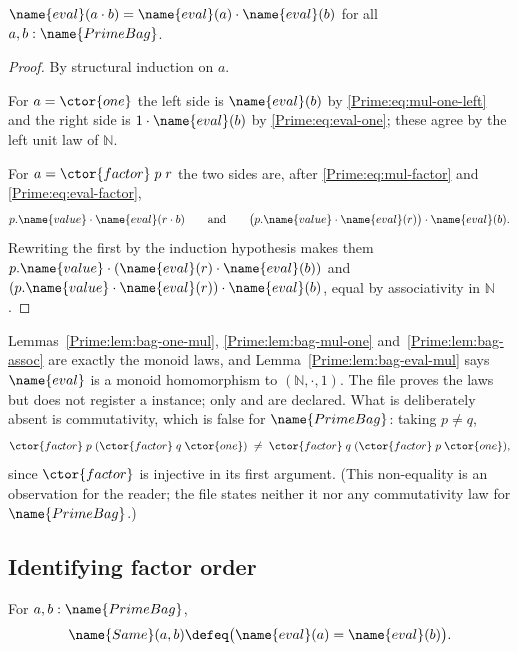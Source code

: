\begin{lemma}\label{Prime:lem:bag-eval-mul}
$\name{eval}(a \cdot b) = \name{eval}(a) \cdot \name{eval}(b)$ for all
$a, b : \name{PrimeBag}$.
\end{lemma}

\begin{proof}
By structural induction on $a$.

For $a = \ctor{one}$ the left side is $\name{eval}(b)$ by
\eqref{Prime:eq:mul-one-left} and the right side is $1 \cdot \name{eval}(b)$ by
\eqref{Prime:eq:eval-one}; these agree by the left unit law of $\mathbb{N}$.

For $a = \ctor{factor}\;p\;r$ the two sides are, after
\eqref{Prime:eq:mul-factor} and \eqref{Prime:eq:eval-factor},
\[
  p.\name{value} \cdot \name{eval}(r \cdot b)
  \qquad\text{and}\qquad
  \bigl(p.\name{value} \cdot \name{eval}(r)\bigr) \cdot \name{eval}(b).
\]
Rewriting the first by the induction hypothesis makes them
$p.\name{value} \cdot (\name{eval}(r) \cdot \name{eval}(b))$ and
$(p.\name{value} \cdot \name{eval}(r)) \cdot \name{eval}(b)$, equal by
associativity in $\mathbb{N}$.
\end{proof}

\begin{remark}\label{Prime:rem:bag-monoid}
Lemmas~\ref{Prime:lem:bag-one-mul}, \ref{Prime:lem:bag-mul-one} and~\ref{Prime:lem:bag-assoc}
are exactly the monoid laws, and Lemma~\ref{Prime:lem:bag-eval-mul} says
$\name{eval}$ is a monoid homomorphism to $(\mathbb{N}, \cdot, 1)$.  The file
proves the laws but does not register a  instance; only
 and  are declared.  What is deliberately absent is
commutativity, which is false for $\name{PrimeBag}$: taking $p \neq q$,
\[
  \ctor{factor}\;p\;(\ctor{factor}\;q\;\ctor{one})
  \;\neq\;
  \ctor{factor}\;q\;(\ctor{factor}\;p\;\ctor{one}),
\]
since $\ctor{factor}$ is injective in its first argument.  (This
non-equality is an observation for the reader; the file states neither it nor
any commutativity law for $\name{PrimeBag}$.)
\end{remark}

\subsection{Identifying factor order}

\begin{definition}\label{Prime:def:same}
For $a, b : \name{PrimeBag}$,
\[
  \name{Same}(a, b) \defeq \bigl(\name{eval}(a) = \name{eval}(b)\bigr).
\]
\end{definition}

